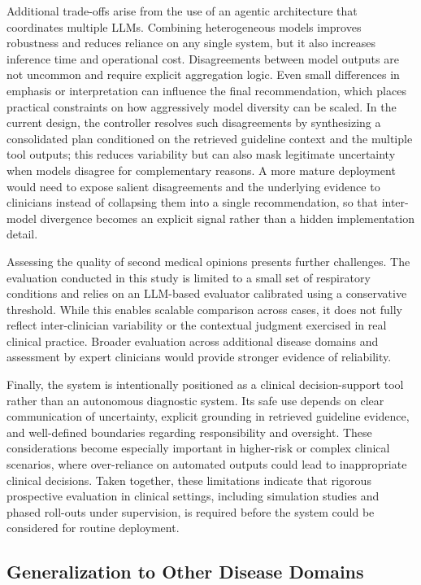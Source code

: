 \documentclass[preprint,12pt]{elsarticle}
\begin{document}
Additional trade-offs arise from the use of an agentic architecture that coordinates multiple LLMs. Combining heterogeneous models improves robustness and reduces reliance on any single system, but it also increases inference time and operational cost. Disagreements between model outputs are not uncommon and require explicit aggregation logic. Even small differences in emphasis or interpretation can influence the final recommendation, which places practical constraints on how aggressively model diversity can be scaled. In the current design, the controller resolves such disagreements by synthesizing a consolidated plan conditioned on the retrieved guideline context and the multiple tool outputs; this reduces variability but can also mask legitimate uncertainty when models disagree for complementary reasons. A more mature deployment would need to expose salient disagreements and the underlying evidence to clinicians instead of collapsing them into a single recommendation, so that inter-model divergence becomes an explicit signal rather than a hidden implementation detail.



Assessing the quality of second medical opinions presents further challenges. The evaluation conducted in this study is limited to a small set of respiratory conditions and relies on an LLM-based evaluator calibrated using a conservative threshold. While this enables scalable comparison across cases, it does not fully reflect inter-clinician variability or the contextual judgment exercised in real clinical practice. Broader evaluation across additional disease domains and assessment by expert clinicians would provide stronger evidence of reliability.

Finally, the system is intentionally positioned as a clinical decision-support tool rather than an autonomous diagnostic system. Its safe use depends on clear communication of uncertainty, explicit grounding in retrieved guideline evidence, and well-defined boundaries regarding responsibility and oversight. These considerations become especially important in higher-risk or complex clinical scenarios, where over-reliance on automated outputs could lead to inappropriate clinical decisions. Taken together, these limitations indicate that rigorous prospective evaluation in clinical settings, including simulation studies and phased roll-outs under supervision, is required before the system could be considered for routine deployment.

\subsection[]{Generalization to Other Disease Domains}
\label{subsec:generalization}
\end{document}
